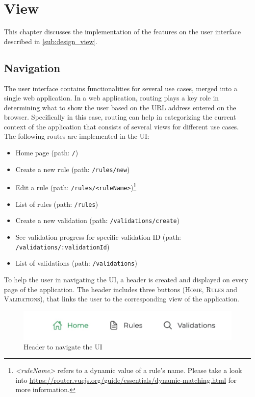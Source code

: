 \section{View}

  This chapter discusses the implementation of the features on the user interface described in \autoref{sub:design_view}. 

  \subsection{Navigation}
  
    The user interface contains functionalities for several use cases, merged into a single web application. In a web application, routing plays a key role in determining what to show the user based on the URL address entered on the browser. Specifically in this case, routing can help in categorizing the current context of the application that consists of several views for different use cases. The following routes are implemented in the UI:

    \begin{itemize}
     \item Home page (path: \verb;/;)
     \item Create a new rule (path: \verb;/rules/new;)
     \item Edit a rule (path: \verb;/rules/<ruleName>;)\footnote{\emph{<ruleName>} refers to a dynamic value of a rule's name. Please take a look into \url{https://router.vuejs.org/guide/essentials/dynamic-matching.html} for more information.}
     \item List of rules (path: \verb;/rules;)
     \item Create a new validation (path: \verb;/validations/create;)
     \item See validation progress for specific validation ID (path: \verb;/validations/:validationId;)
     \item List of validations (path: \verb;/validations;)
    \end{itemize}
    
    To help the user in navigating the UI, a header is created and displayed on every page of the application. The header includes three buttons (\textsc{Home, Rules} and \textsc{Validations}), that links the user to the corresponding view of the application. 

    \begin{figure}[!ht]
     \includegraphics[width=\textwidth]{images/ss_navigation.jpeg}
     \caption{Header to navigate the UI}
    \end{figure}


